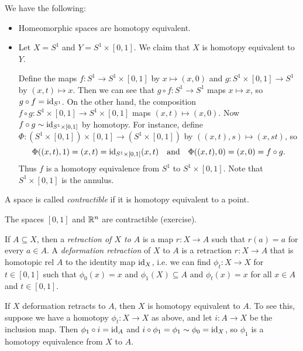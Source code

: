 \begin{example}
  We have the following:
  \begin{itemize}
    \item Homeomorphic spaces are homotopy equivalent.
    \item Let $X = S^1$ and $Y = S^1 \times [0, 1]$.
      We claim that $X$ is homotopy equivalent to $Y$.

      Define the maps $f : S^1 \to S^1 \times [0, 1]$ by
      $x \mapsto (x, 0)$ and $g : S^1 \times [0, 1] \to S^1$
      by $(x, t) \mapsto x$. Then we can see
      that $g \circ f : S^1 \to S^1$ maps
      $x \mapsto x$, so $g \circ f = \operatorname{id}_{S^1}$. On the
      other hand, the composition
      $f \circ g : S^1 \times [0, 1] \to
      S^1 \times [0, 1]$ maps $(x, t) \mapsto (x, 0)$.
      Now $f \circ g \sim \operatorname{id}_{S^1 \times [0, 1]}$ by
      homotopy. For instance, define
      $\Phi : (S^1 \times [0, 1]) \times [0, 1] \to
      (S^1 \times [0, 1])$ by
      $((x, t), s) \mapsto (x, st)$, so
      \[
        \Phi((x, t), 1) = (x, t) = \operatorname{id}_{S^1 \times [0, 1]}(x, t)
        \quad \text{and} \quad
        \Phi((x, t), 0) = (x, 0) = f \circ g.
      \]
      Thus $f$ is a homotopy equivalence from $S^1$ to
      $S^1 \times [0, 1]$. Note that
      $S^1 \times [0, 1]$ is the annulus.
  \end{itemize}
\end{example}

\begin{definition}
  A space is called \emph{contractible} if it is
  homotopy equivalent to a point.
\end{definition}

\begin{example}
  The spaces $[0, 1]$ and $\mathbb{R}^n$ are contractible
  (exercise).
\end{example}

\begin{definition}
  If $A \subseteq X$, then a \emph{retraction of $X$ to $A$}
  is a map $r : X \to A$ such that $r(a) = a$ for
  every $a \in A$. A \emph{deformation retraction} of
  $X$ to $A$ is a retraction $r : X \to A$
  that is homotopic rel $A$ to the identity map $\operatorname{id}_X$,
  i.e. we can find $\phi_t : X \to X$ for
  $t \in [0, 1]$ such that
  $\phi_0(x) = x$ and $\phi_1(X) \subseteq A$ and
  $\phi_t(x) = x$ for all $x \in A$ and $t \in [0, 1]$.
\end{definition}

\begin{remark}
  If $X$ deformation retracts to $A$, then $X$ is
  homotopy equivalent to $A$. To see this, suppose we
  have a homotopy $\phi_t : X \to X$ as above, and let
  $i : A \to X$ be the inclusion map. Then
  $\phi_1 \circ i = \operatorname{id}_A$ and $i \circ \phi_1 = \phi_1 \sim \phi_0 = \operatorname{id}_X$, so
  $\phi_1$ is a homotopy equivalence from $X$ to $A$.
\end{remark}

